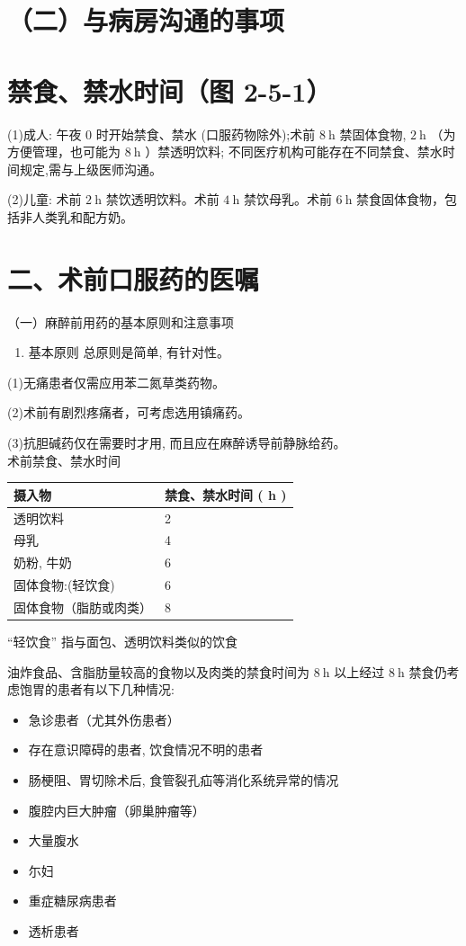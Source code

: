 \documentclass[10pt]{article}
\begin{document}
\section*{（二）与病房沟通的事项}
\section*{禁食、禁水时间（图 2-5-1）}
(1)成人: 午夜 0 时开始禁食、禁水 (口服药物除外);术前 $8 \mathrm{~h}$ 禁固体食物, $2 \mathrm{~h}$ （为方便管理，也可能为 $8 \mathrm{~h}$ ）禁透明饮料; 不同医疗机构可能存在不同禁食、禁水时间规定,需与上级医师沟通。

(2)儿童: 术前 $2 \mathrm{~h}$ 禁饮透明饮料。术前 $4 \mathrm{~h}$ 禁饮母乳。术前 $6 \mathrm{~h}$ 禁食固体食物，包括非人类乳和配方奶。

\section*{二、术前口服药的医嘱}
（一）麻醉前用药的基本原则和注意事项

\begin{enumerate}
  \item 基本原则 总原则是简单, 有针对性。
\end{enumerate}

(1)无痛患者仅需应用苯二氮草类药物。

(2)术前有剧烈疼痛者，可考虑选用镇痛药。

(3)抗胆碱药仅在需要时才用, 而且应在麻醉诱导前静脉给药。\\
术前禁食、禁水时间

\begin{center}
\begin{tabular}{ll}
\hline
摄入物 & 禁食、禁水时间 ( h ) \\
\hline
透明饮料 & 2 \\
母乳 & 4 \\
奶粉, 牛奶 & 6 \\
固体食物:(轻饮食) & 6 \\
固体食物（脂肪或肉类） & 8 \\
\hline
\end{tabular}
\end{center}

“轻饮食” 指与面包、透明饮料类似的饮食

油炸食品、含脂肪量较高的食物以及肉类的禁食时间为 $8 \mathrm{~h}$ 以上经过 $8 \mathrm{~h}$ 禁食仍考虑饱胃的患者有以下几种情况:

\begin{itemize}
  \item 急诊患者（尤其外伤患者）
  \item 存在意识障碍的患者, 饮食情况不明的患者
  \item 肠梗阻、胃切除术后, 食管裂孔疝等消化系统异常的情况
  \item 腹腔内巨大肿瘤（卵巢肿瘤等）
  \item 大量腹水
  \item 尓妇
  \item 重症糖尿病患者
  \item 透析患者
\end{itemize}
\end{document}
